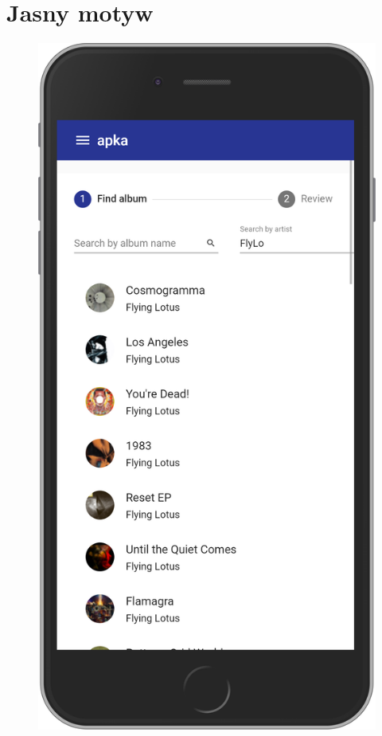 \section{Jasny motyw}
	\begin{figure}[H]
		\centering
		\begin{minipage}{.5\textwidth}
			\includegraphics[width=0.9\linewidth]{rys06/search_light.png}
		\end{minipage}%

\end{figure}
